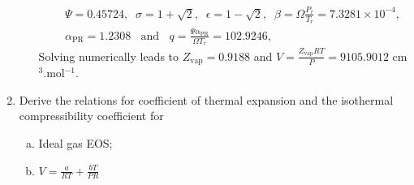 \documentclass[12pts,a4paper,amsmath,amssymb,floatfix]{article}%
\newcommand{\frc}{\displaystyle\frac}
\begin{document}
\begin{enumerate}[1)]
\begin{enumerate}[a)]
\begin{eqnarray}
                     && \Psi = 0.45724,\;\; \sigma=1+\sqrt{2},\;\;\epsilon=1-\sqrt{2},\;\;\beta=\Omega\frc{P_{r}}{T_{r}}=7.3281\times 10^{-4},\nonumber \\
                     && \alpha_{\text{PR}} = 1.2308\;\;\text{ and }\;\; q = \frc{\Psi\alpha_{\text{PR}}}{\Omega T_{r}} = 102.9246, \nonumber 
                  \end{eqnarray}
                  Solving numerically leads to $Z_{\text{vap}}=0.9188$ and $V=\frc{Z_{\text{vap}}RT}{P} = 9105.9012$ cm$^{3}$.mol$^{-1}$.
%
           \end{enumerate}
\clearpage
   \item\label{Mod02Ex03} Derive the relations for coefficient of thermal expansion and the isothermal compressibility coefficient for
              \begin{enumerate}[(a)]
                  \item Ideal gas EOS;
                  \item $V=\frc{a}{RT}+\frc{bT}{PR}$ 
              \end{enumerate}


\end{enumerate}
\end{document}

